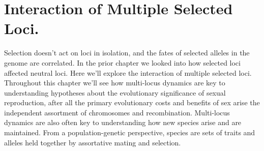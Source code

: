 \chapter{Interaction of Multiple Selected Loci.}

Selection doesn't act on loci in isolation, and the fates of selected alleles in the genome are correlated. In the prior chapter we looked into how selected loci affected neutral loci. Here we'll explore the interaction of multiple selected loci. Throughout this chapter we'll see how multi-locus dynamics are key to understanding hypotheses about the evolutionary significance of sexual reproduction, after all the primary evolutionary costs and benefits of sex arise the independent assortment of chromosomes and recombination. Multi-locus dynamics are also often key to understanding how new species arise and are maintained. From a population-genetic perspective, species are sets of traits and alleles held together by assortative mating and selection.

